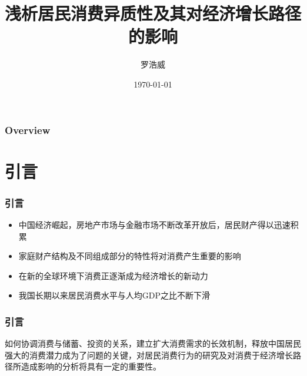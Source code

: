 \documentclass{beamer}
\title[答辩]{浅析居民消费异质性及其对经济增长路径的影响} %
\author{罗浩威} %
\institute[] %
{
华中科技大学\\ %
\medskip
\textit{LoweetLo@outlook.com} %
}
\date{\today} %
\begin{document}
\begin{frame}
\titlepage %
\end{frame}

\begin{frame}
\frametitle{Overview} %
\tableofcontents %
\end{frame}
\section{引言} %


\begin{frame}
\frametitle{引言}
\begin{itemize}
\item 中国经济崛起，房地产市场与金融市场不断改革开放后，居民财产得以迅速积累
\item 家庭财产结构及不同组成部分的特性将对消费产生重要的影响
\item 在新的全球环境下消费正逐渐成为经济增长的新动力
\item 我国长期以来居民消费水平与人均GDP之比不断下滑
\end{itemize}
\end{frame}

\begin{frame}
\frametitle{引言}
如何协调消费与储蓄、投资的关系，建立扩大消费需求的长效机制，释放中国居民强大的消费潜力成为了问题的关键，对居民消费行为的研究及对消费于经济增长路径所造成影响的分析将具有一定的重要性。
\end{frame}
\end{document}
